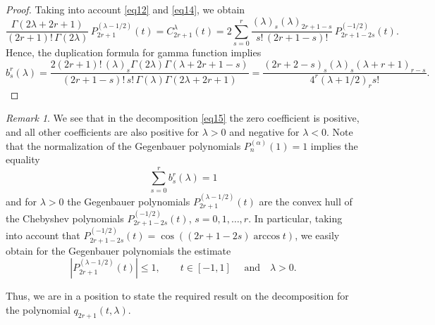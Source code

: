 \documentclass[12pt,twoside,reqno]{amsart}\usepackage[cp1251]{inputenc}
\theoremstyle{plain}
\theoremstyle{remark}
\newtheorem{remark}[theorem]{Remark}
\begin{document}
\begin{proof} Taking into account   \eqref{eq12} and \eqref{eq14}, we obtain
\[
\frac{\Gamma(2\lambda+2r+1)}{(2r+1)!\,\Gamma(2\lambda)}\,P_{2r+1}^{(\lambda-1/2)}(t)=
C_{2r+1}^{\lambda}(t)=2\sum_{s=0}^{r}\frac{(\lambda)_s(\lambda)_{2r+1-s}}{s!\,(2r+1-s)!}\,P_{2r+1-2s}^{(-1/2)}(t).
\]
Hence,
the duplication formula for gamma function  implies
$$%
b_s^r(\lambda)=\frac{2(2r+1)!\,(\lambda)_s\Gamma(2\lambda)\Gamma(\lambda+2r+1-s)}{(2r+1-s)!\,s!\,\Gamma(\lambda)\Gamma(2\lambda+2r+1)}
=\frac{(2r+2-s)_{s}(\lambda)_{s}(\lambda+r+1)_{r-s}}{4^r(\lambda+1/2)_{r}s!}.
$$%
\end{proof}

\begin{remark}\label{rem2}
We see that in the decomposition \eqref{eq15} the zero coefficient is positive, and all other coefficients are also positive for $\lambda>0$ and
negative for $\lambda<0$. Note that the normalization of the Gegenbauer polynomials $P_{n}^{(\alpha)}(1) =1$  implies the equality
\[
\sum_{s=0}^{r}b_s^r(\lambda)=1
\]
and for $\lambda>0$ the Gegenbauer polynomials $P_{2r+1}^{(\lambda-1/2)}(t)$ are the convex hull of the Chebyshev polynomials
$P_{2r+1-2s}^{(-1/2)}(t)$, $s=0,1,\dots,r$. In particular, taking into account that %
 $P_{2r+1-2s}^{(-1/2)}(t)=\cos{}(({2r+1-2s})\arccos t)$, we easily obtain for the Gegenbauer polynomials the estimate
\[
|P_{2r+1}^{(\lambda-1/2)}(t)|\le 1,\qquad   t\in [-1,1]\quad\mbox{ and} \quad \lambda>0.
\]
\end{remark}
Thus,  we are in a position to state the required result on the decomposition for the polynomial $q_{2r+1}(t,\lambda)$.



\end{document}
